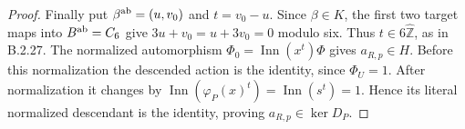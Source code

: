 \begin{proof}
Finally put $\beta^{\rm ab}=(u,v_0)$ and $t=v_0-u$.
Since $\beta\in K$, the first two target maps into
$B^{\rm ab}=C_6$ give $3u+v_0=u+3v_0=0$ modulo six.
Thus $t\in6\widehat{\mathbb Z}$, as in B.2.27.
The normalized automorphism
$\Phi_0=\operatorname{Inn}(x^t)\Phi$ gives
$a_{R,p}\in H$.  Before this normalization the
descended action is the identity, since
$\Phi_U=1$.  After normalization it changes by
$\operatorname{Inn}(\varphi_P(x)^t)
=\operatorname{Inn}(s^t)=1$.  Hence its literal
normalized descendant is the identity, proving
$a_{R,p}\in\ker D_P$.
\end{proof}

